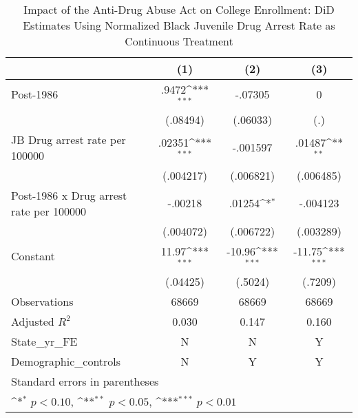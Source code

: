\begin{table}[htbp]\centering
\def\sym#1{\ifmmode^{#1}\else\(^{#1}\)\fi}
\caption{Impact of the Anti-Drug Abuse Act on College Enrollment: DiD Estimates Using Normalized Black Juvenile Drug Arrest Rate as Continuous Treatment}
\begin{tabular}{l*{3}{c}}
\hline\hline
                    &\multicolumn{1}{c}{(1)}         &\multicolumn{1}{c}{(2)}         &\multicolumn{1}{c}{(3)}         \\
\hline
Post-1986           &       .9472\sym{***}&     -.07305         &           0         \\
                    &    (.08494)         &    (.06033)         &         (.)         \\
[1em]
JB Drug arrest rate per 100000&      .02351\sym{***}&    -.001597         &      .01487\sym{**} \\
                    &   (.004217)         &   (.006821)         &   (.006485)         \\
[1em]
Post-1986 x Drug arrest rate per 100000&     -.00218         &      .01254\sym{*}  &    -.004123         \\
                    &   (.004072)         &   (.006722)         &   (.003289)         \\
[1em]
Constant            &       11.97\sym{***}&      -10.96\sym{***}&      -11.75\sym{***}\\
                    &    (.04425)         &     (.5024)         &     (.7209)         \\
\hline
Observations        &       68669         &       68669         &       68669         \\
Adjusted \(R^{2}\)  &       0.030         &       0.147         &       0.160         \\
State\_yr\_FE         &           N         &           N         &           Y         \\
Demographic\_controls&           N         &           Y         &           Y         \\
\hline\hline
\multicolumn{4}{l}{\footnotesize Standard errors in parentheses}\\
\multicolumn{4}{l}{\footnotesize \sym{*} \(p<0.10\), \sym{**} \(p<0.05\), \sym{***} \(p<0.01\)}\\
\end{tabular}
\end{table}
